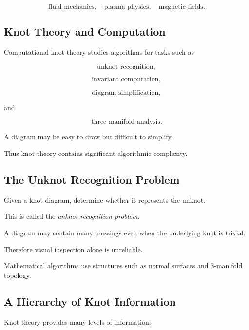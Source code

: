 \[
\boxed{
\text{fluid mechanics},
\quad
\text{plasma physics},
\quad
\text{magnetic fields}.
}
\]

\subsection{Knot Theory and Computation}
\label{subsec:knot-theory-computation}

Computational knot theory studies algorithms for tasks such as

\[
\boxed{
\text{unknot recognition},
}
\]

\[
\boxed{
\text{invariant computation},
}
\]

\[
\boxed{
\text{diagram simplification},
}
\]

and

\[
\boxed{
\text{three-manifold analysis}.
}
\]

A diagram may be easy to draw but difficult to simplify.

Thus knot theory contains significant algorithmic complexity.

\subsection{The Unknot Recognition Problem}
\label{subsec:unknot-recognition}

Given a knot diagram, determine whether it represents the unknot.

This is called the \emph{unknot recognition problem}.

A diagram may contain many crossings even when the underlying knot is
trivial.

Therefore visual inspection alone is unreliable.

Mathematical algorithms use structures such as normal surfaces and
\(3\)-manifold topology.

\subsection{A Hierarchy of Knot Information}
\label{subsec:hierarchy-knot-information}

Knot theory provides many levels of information:

